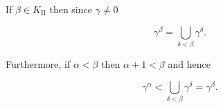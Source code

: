 If $\beta \in K_{\text{II}}$ then since $\gamma \neq 0$

$$\gamma^{\beta} = \bigcup_{\delta < \beta} \gamma^{\delta}.$$

Furthermore, if $\alpha < \beta$ then $\alpha + 1 < \beta$ and hence

$$\gamma^{\alpha} < \bigcup_{\delta < \beta} \gamma^{\delta} = \gamma^{\beta}.$$
